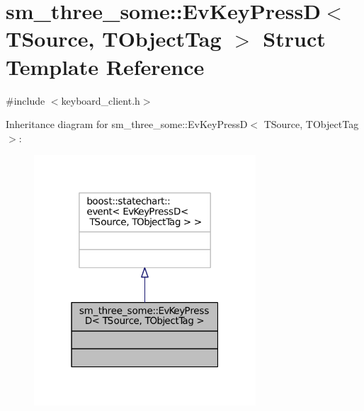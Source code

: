 \hypertarget{structsm__three__some_1_1EvKeyPressD}{}\section{sm\+\_\+three\+\_\+some\+:\+:Ev\+Key\+PressD$<$ T\+Source, T\+Object\+Tag $>$ Struct Template Reference}
\label{structsm__three__some_1_1EvKeyPressD}


{\ttfamily \#include $<$keyboard\+\_\+client.\+h$>$}



Inheritance diagram for sm\+\_\+three\+\_\+some\+:\+:Ev\+Key\+PressD$<$ T\+Source, T\+Object\+Tag $>$\+:
\nopagebreak
\begin{figure}[H]
\begin{center}
\leavevmode
\includegraphics[width=235pt]{structsm__three__some_1_1EvKeyPressD__inherit__graph}
\end{center}
\end{figure}


